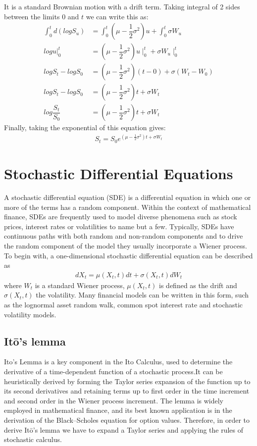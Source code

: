 It is a standard Brownian motion with a drift term. Taking integral of  2 sides between the limits $0$ and $t$ we can write this as:
\begin{align*}
\int_{0}^{t}d(logS_u)&=\int_{0}^{t}\left(\mu -\dfrac{1}{2}\sigma^2 \right)u+\int_{0}^{t}\sigma W_u\\
logu|_0^t&=\left(\mu -\dfrac{1}{2}\sigma^2 \right)u\mid_0^t+\sigma W_u\mid_0^t\\
logS_t-logS_0&=\left(\mu -\dfrac{1}{2}\sigma^2 \right)(t-0)+\sigma(W_t-W_0)\\
logS_t-logS_0&=\left(\mu -\dfrac{1}{2}\sigma^2 \right)t+\sigma W_t\\
log\dfrac{S_t}{S_0}&=\left(\mu -\dfrac{1}{2}\sigma^2 \right)t+\sigma W_t
\end{align*}
Finally, taking the exponential of this equation gives:
\begin{align}
S_t=S_0e^{\left(\mu -\frac{1}{2}\sigma^2 \right)t+\sigma W_t}
\end{align} \label{eq2}

\section{Stochastic Differential Equations}

\textnormal A stochastic differential equation (SDE) is a differential equation in which one or more of
the terms has a random component. Within the context of mathematical finance, SDEs are
frequently used to model diverse phenomena such as stock prices, interest rates or volatilities
to name but a few. Typically, SDEs have continuous paths with both random and non-random
components and to drive the random component of the model they usually incorporate a Wiener
process.\\[0.5cm]
To begin with, a one-dimensional stochastic differential equation can be described as
\begin{align*}
dX_t=\mu(X_t,t)dt+\sigma(X_t,t)dW_t
\end{align*} 
where $W_t$ is a standard Wiener process, $\mu(X_t, t)$ is defined as the drift and $\sigma(X_t, t)$ the volatility.
Many financial models can be written in this form, such as the lognormal asset random walk,
common spot interest rate and stochastic volatility models.

\subsection{It\=o's lemma}
Ito's Lemma is a key component in the Ito Calculus, used to determine the derivative of a time-dependent function of a stochastic process.It can be heuristically derived by forming the Taylor series expansion of the function up to its second derivatives and retaining terms up to first order in the time increment and second order in the Wiener process increment. The lemma is widely employed in mathematical finance, and its best known application is in the derivation of the Black–Scholes equation for option values. Therefore, in order to derive It\=o's lemma we have to expand a Taylor series and applying the rules of stochastic calculus.

